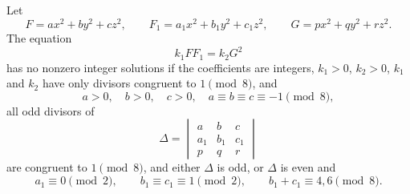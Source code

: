 \begin{proposition}
    Let
\[
    F=ax^2+by^2+cz^2,\qquad F_1=a_1x^2+b_1y^2+c_1z^2,\qquad G=px^2+qy^2+rz^2.
\]
    The equation
\[
    k_1FF_1=k_2G^2
\]
    has no nonzero integer solutions if the coefficients are integers, $k_1>0$, $k_2>0$, $k_1$ and $k_2$ have only divisors congruent to $1\pmod8$, and
\[
    a>0,\quad b>0,\quad c>0,\quad a\equiv b\equiv c\equiv-1\pmod8,
\]
    all odd divisors of
\[
    \Delta=
    \begin{vmatrix}
    a & b & c\\
    a_1 & b_1 & c_1\\
    p & q & r
    \end{vmatrix}
\]
    are congruent to $1\pmod8$, and either $\Delta$ is odd, or $\Delta$ is even and
\[
    a_1\equiv0\pmod2,\qquad b_1\equiv c_1\equiv1\pmod2,\qquad b_1+c_1\equiv4,6\pmod8.
\]
\end{proposition}
